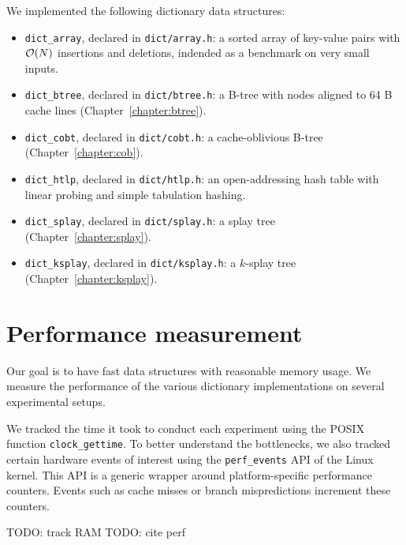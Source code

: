 We implemented the following dictionary data structures:
\begin{itemize}
\item \texttt{dict\_array}, declared in \texttt{dict/array.h}:
	a sorted array of key-value pairs with $\mathcal{O}(N)$ insertions and deletions,
	indended as a benchmark on very small inputs.
\item \texttt{dict\_btree}, declared in \texttt{dict/btree.h}:
	a B-tree with nodes aligned to 64 B cache lines
	(Chapter~\ref{chapter:btree}).
\item \texttt{dict\_cobt}, declared in \texttt{dict/cobt.h}:
	a cache-oblivious B-tree (Chapter~\ref{chapter:cob}).
\item \texttt{dict\_htlp}, declared in \texttt{dict/htlp.h}:
	an open-addressing hash table with linear probing and simple tabulation
	hashing.
\item \texttt{dict\_splay}, declared in \texttt{dict/splay.h}:
	a splay tree (Chapter~\ref{chapter:splay}).
\item \texttt{dict\_ksplay}, declared in \texttt{dict/ksplay.h}:
	a $k$-splay tree (Chapter~\ref{chapter:ksplay}). %
\end{itemize}

\section{Performance measurement}

Our goal is to have fast data structures with reasonable memory usage.
We measure the performance of the various dictionary implementations
on several experimental setups.

We tracked the time it took to conduct each experiment using the POSIX function
\texttt{clock\_gettime}. To better understand the bottlenecks, we also
tracked certain hardware events of interest using the \texttt{perf\_events} API
of the Linux kernel. This API is a generic wrapper around platform-specific
performance counters. Events such as cache misses or branch mispredictions
increment these counters.

TODO: track RAM
TODO: cite perf

